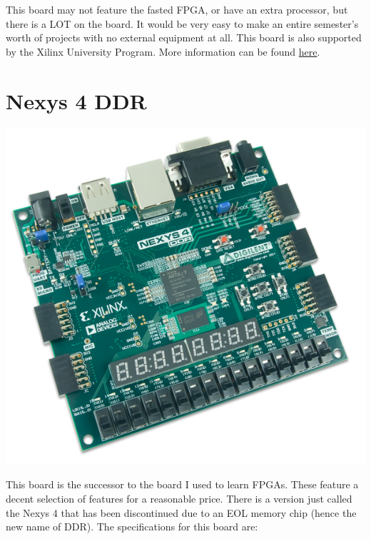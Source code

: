 \documentclass{article}
\begin{document}
	This board may not feature the fasted FPGA, or have an extra processor, but there is a LOT on the board.
	It would be very easy to make an entire semester's worth of projects with no external equipment at all.
	 This board is also supported by the Xilinx University Program. More information can be found 
	\href{http://www.xilinx.com/support/university/boards-portfolio/xup-boards/AtlysBoard.html}{here}.
	
	\newpage
	\section{Nexys 4 DDR}
	\includegraphics[scale=0.5]{Nexys4}

	This board is the successor to the board I used to learn FPGAs. These feature a decent selection of features
	for a reasonable price. There is a version just called the Nexys 4 that has been discontinued due to an EOL
	memory chip (hence the new name of DDR). The specifications for this board are:
\end{document}
